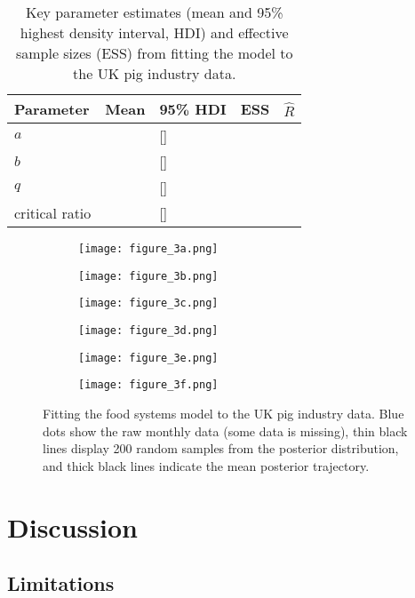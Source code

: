 \documentclass[12pt]{article}
\begin{document}
\begin{table}[t!]
  \centering
  \footnotesize
  \begin{tabular}{p{5cm}p{2cm}p{3cm}p{2cm}p{2cm}}
    \textbf{Parameter} & \textbf{Mean} & \textbf{95\% HDI} & \textbf{ESS} & \textbf{$\hat{R}$} \\ \hline
    $a$ &  & [] &  & \\
    $b$ &  & [] & & \\
    $q$ &  & [] &  & \\
    critical ratio &  & [] & & \\
  \end{tabular}
  \caption{Key parameter estimates (mean and 95\% highest density interval, HDI) and effective sample sizes (ESS) from fitting the model to the UK pig industry data.}
  \label{table_parameter_estimates}
\end{table}

\begin{figure}[t!]
  \begin{subfigure}{0.5\textwidth}
    \texttt{[image: figure\_3a.png]}
  \end{subfigure}%
  \begin{subfigure}{0.5\textwidth}
    \texttt{[image: figure\_3b.png]}
  \end{subfigure}

  \begin{subfigure}{0.5\textwidth}
    \texttt{[image: figure\_3c.png]}
  \end{subfigure}%
  \begin{subfigure}{0.5\textwidth}
    \texttt{[image: figure\_3d.png]}
  \end{subfigure}

  \begin{subfigure}{0.5\textwidth}
    \texttt{[image: figure\_3e.png]}
  \end{subfigure}%
  \begin{subfigure}{0.5\textwidth}
    \texttt{[image: figure\_3f.png]}
  \end{subfigure}
  \caption{Fitting the food systems model to the UK pig industry data. Blue dots show the raw monthly data (some data is missing), thin black lines display 200 random samples from the posterior distribution, and thick black lines indicate the mean posterior trajectory.}
\end{figure}

\section{Discussion}

\subsection{Limitations}


\newpage
\printbibliography
\end{document}
